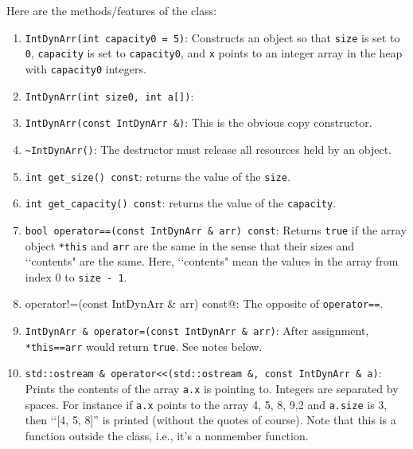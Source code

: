 Here are the methods/features of the class:
\begin{enumerate}
\item \verb!IntDynArr(int capacity0 = 5)!:
  Constructs an object so that 
  \verb!size! is set to \verb!0!,
  \verb!capacity! is set to \verb!capacity0!,
  and \verb!x! points to an 
  integer array in the heap with \verb!capacity0! integers.

\item \verb!IntDynArr(int size0, int a[])!:
  
\item \verb!IntDynArr(const IntDynArr &)!: This is the obvious copy 
constructor. 

\item \verb!~IntDynArr()!: The destructor must release all resources held by 
an object.

\item \verb!int get_size() const!: returns the value of the \verb!size!.
\item \verb!int get_capacity() const!: returns the value of the 
\verb!capacity!.

\item \verb!bool operator==(const IntDynArr & arr) const!: Returns \verb!true! if 
the array object \verb!*this! and \verb!arr! are the same in the sense that 
their sizes and \lq\lq contents" are the same. Here, \lq\lq contents" mean the 
values in the array from index 0 to \verb!size - 1!. 

\item \verb@bool operator!=(const IntDynArr & arr) const@: The opposite of 
\verb!operator==!.

\item \verb!IntDynArr & operator=(const IntDynArr & arr)!: After assignment, 
\verb!*this==arr! would return \verb!true!. See notes below.

\item \verb!std::ostream & operator<<(std::ostream &, const IntDynArr & a)!: 
Prints the contents of the array \verb!a.x! is pointing to. Integers are 
separated by spaces. For instance if \verb!a.x! points to the array 
4, 5, 8, 9,2 and \verb!a.size! is 3, then \lq\lq [4, 5, 8]” is printed 
(without the quotes of course). Note that this is a function outside the 
class, i.e., it's a nonmember function.


\end{enumerate}
